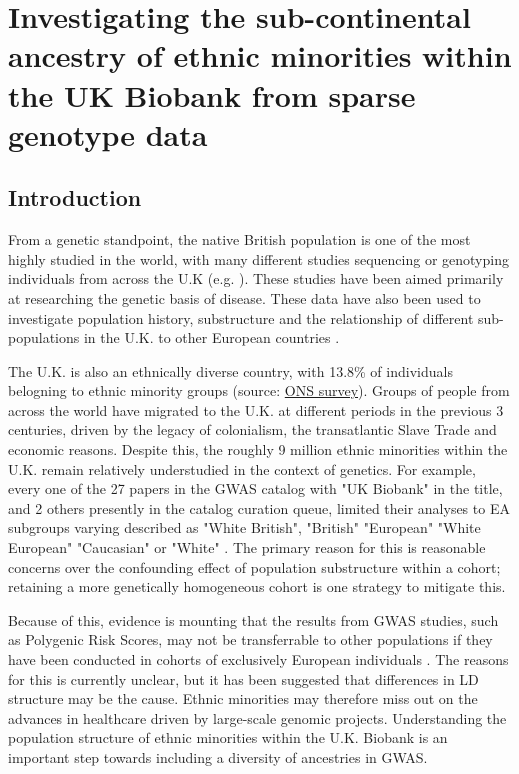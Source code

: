 \chapter{Investigating the sub-continental ancestry of ethnic minorities within the UK Biobank from sparse genotype data}
\label{chapterlabel3}

\section{Introduction}

From a genetic standpoint, the native British population is one of the most highly studied in the world, with many different studies sequencing or genotyping individuals from across the U.K (e.g. \cite{bycroft2018uk, Leslie2015, turnbull2018introducing, uk10k2015uk10k}). These studies have been aimed primarily at researching the genetic basis of disease. These data have also been used to investigate population history, substructure  and the relationship of different sub-populations in the U.K. to other European countries \cite{Leslie2015}.  

The U.K. is also an ethnically diverse country, with 13.8\% of individuals belogning to ethnic minority groups (source: \href{https://www.ons.gov.uk/peoplepopulationandcommunity/populationandmigration/populationestimates/articles/researchreportonpopulationestimatesbyethnicgroupandreligion/2019-12-04}{ONS survey}). Groups of people from across the world have migrated to the U.K. at different periods in the previous 3 centuries, driven by the legacy of colonialism, the transatlantic Slave Trade and economic reasons. Despite this, the roughly 9 million ethnic minorities within the U.K. remain relatively understudied in the context of genetics. For example, every one of the 27 papers in the GWAS catalog with "UK Biobank" in the title, and 2 others presently in the catalog curation queue, limited their analyses to EA subgroups varying described as "White British", "British" "European" "White European" "Caucasian" or "White" \cite{manolio2019using}. The primary reason for this is reasonable concerns over the confounding effect of population substructure within a cohort; retaining a more genetically homogeneous cohort is one strategy to mitigate this. 

Because of this, evidence is mounting that the results from GWAS studies, such as Polygenic Risk Scores, may not be transferrable to other populations if they have been conducted in cohorts of exclusively European individuals \cite{kuchenbaecker2019transferability}. The reasons for this is currently unclear, but it has been suggested that differences in LD structure may be the cause. Ethnic minorities may therefore miss out on the advances in healthcare driven by large-scale genomic projects. Understanding the population structure of ethnic minorities within the U.K. Biobank is an important step towards including a diversity of ancestries in GWAS. 

